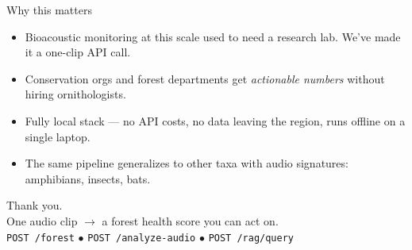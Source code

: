 \documentclass[aspectratio=169]{beamer}
\begin{document}
\begin{frame}{Why this matters}
  \begin{itemize}
    \item Bioacoustic monitoring at this scale used to need a research lab. We've made it a \alert{one-clip API call}.
    \item Conservation orgs and forest departments get \emph{actionable numbers} without hiring ornithologists.
    \item Fully \alert{local stack} --- no API costs, no data leaving the region, runs offline on a single laptop.
    \item The same pipeline generalizes to other taxa with audio signatures: amphibians, insects, bats.
  \end{itemize}
\end{frame}

\begin{frame}[standout]
  Thank you.\\[0.6em]
  \normalsize One audio clip $\rightarrow$ a forest health score you can act on.\\[0.3em]
  \footnotesize \texttt{POST /forest} \quad $\bullet$ \quad \texttt{POST /analyze-audio} \quad $\bullet$ \quad \texttt{POST /rag/query}
\end{frame}
\end{document}
